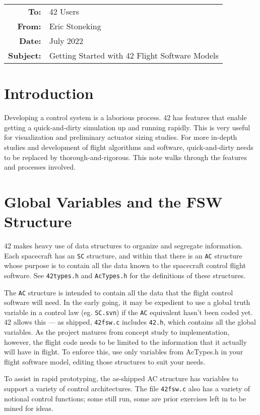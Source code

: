 \documentclass[12pt]{article}
\begin{document}
\begin{tabular}{@{} rl @{}}
    {\bf To:} & 42 Users\\ 
    {\bf From:} & Eric Stoneking \\ 
    {\bf Date:} & July 2022 \\ 
    {\bf Subject:} & Getting Started with 42 Flight Software Models\\ 
\hline
\end{tabular}
  
  
\section{Introduction}

Developing a control system is a laborious process.  42 has features that enable getting a quick-and-dirty simulation up and running rapidly.  This is very useful for visualization and preliminary actuator sizing studies.  For more in-depth studies and development of flight algorithms and software, quick-and-dirty needs to be replaced by thorough-and-rigorous.  This note walks through the features and processes involved.

\section{Global Variables and the FSW Structure}

42 makes heavy use of data structures to organize and segregate information.  Each spacecraft has an {\tt SC} structure, and within that there is an {\tt AC} structure whose purpose is to contain all the data known to the spacecraft control flight software.  See {\tt 42types.h} and {\tt AcTypes.h} for the definitions of these structures.  

The {\tt AC} structure is intended to contain all the data that the flight control software will need.  In the early going, it may be expedient to use a global truth variable in a control law (eg. {\tt SC.svn}) if the {\tt AC} equivalent hasn't been coded yet.  42 allows this --- as shipped, {\tt 42fsw.c} includes {\tt 42.h}, which contains all the global variables.  As the project matures from concept study to implementation, however, the flight code needs to be limited to the information that it actually will have in flight.  To enforce this, use only variables from AcTypes.h in your flight software model, editing those structures to suit your needs.  

To assist in rapid prototyping, the as-shipped AC structure has variables to support a variety of control architectures.  The file {\tt 42fsw.c} also has a variety of notional control functions; some still run, some are prior exercises left in to be mined for ideas.
\end{document}
